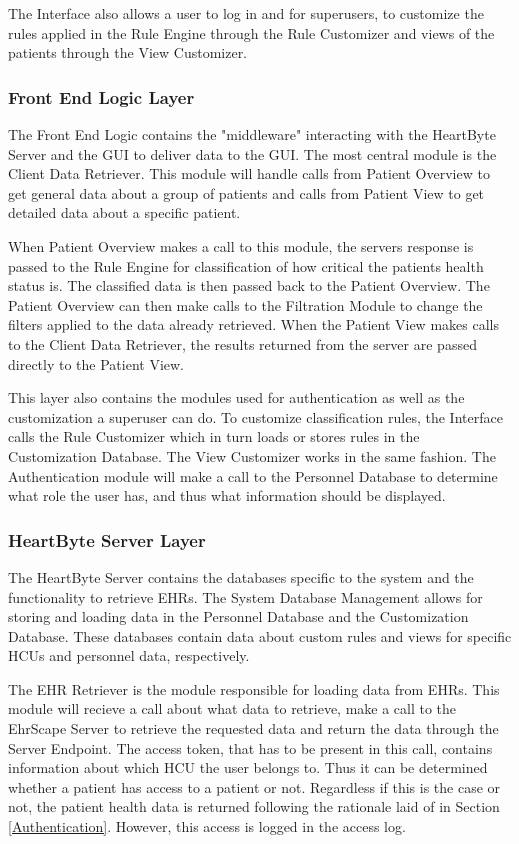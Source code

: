 \documentclass{article}
\begin{document}
The Interface also allows a user to log in and for superusers, to customize the rules applied in the Rule Engine through the Rule Customizer and views of the patients through the View Customizer.

\subsubsection{Front End Logic Layer}
The Front End Logic contains the "middleware" interacting with the HeartByte Server and the GUI to deliver data to the GUI. The most central module is the Client Data Retriever. This module will handle calls from Patient Overview to get general data about a group of patients and calls from Patient View to get detailed data about a specific patient. 

When Patient Overview makes a call to this module, the servers response is passed to the Rule Engine for classification of how critical the patients health status is. The classified data is then passed back to the Patient Overview. The Patient Overview can then make calls to the Filtration Module to change the filters applied to the data already retrieved. When the Patient View makes calls to the Client Data Retriever, the results returned from the server are passed directly to the Patient View.

This layer also contains the modules used for authentication as well as the customization a superuser can do. To customize classification rules, the Interface calls the Rule Customizer which in turn loads or stores rules in the Customization Database. The View Customizer works in the same fashion. The Authentication module will make a call to the Personnel Database to determine what role the user has, and thus what information should be displayed.

\subsubsection{HeartByte Server Layer}
The HeartByte Server contains the databases specific to the system and the functionality to retrieve EHRs. The System Database Management allows for storing and loading data in the Personnel Database and the Customization Database. These databases contain data about custom rules and views for specific HCUs and personnel data, respectively.

The EHR Retriever is the module responsible for loading data from EHRs. This module will recieve a call about what data to retrieve, make a call to the EhrScape Server to retrieve the requested data and return the data through the Server Endpoint. The access token, that has to be present in this call, contains information about which HCU the user belongs to. Thus it can be determined whether a patient has access to a patient or not. Regardless if this is the case or not, the patient health data is returned following the rationale laid of in Section \ref{Authentication}. However, this access is logged in the access log.
\end{document}
